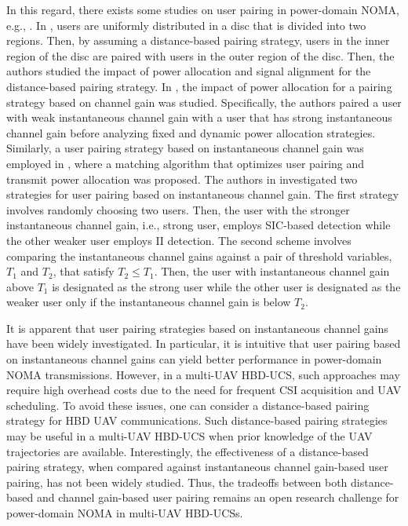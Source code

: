 In this regard, there exists some studies on user pairing in power-domain NOMA, e.g., \cite{ding2016general,ding2016impact,liang2017user,zhang2017downlink}. In \cite{ding2016general}, users are uniformly distributed in a disc that is divided into two regions. Then, by assuming a distance-based pairing strategy, users in the inner region of the disc are paired with users in the outer region of the disc. Then, the authors studied the impact of power allocation and signal alignment for the distance-based pairing strategy. In \cite{ding2016impact}, the impact of power allocation for a pairing strategy based on channel gain was studied. Specifically, the authors paired a user with weak instantaneous channel gain with a user that has strong instantaneous channel gain before analyzing fixed and dynamic power allocation strategies. Similarly, a user pairing strategy based on instantaneous channel gain was employed in \cite{liang2017user}, where a matching algorithm that optimizes user pairing and transmit power allocation was proposed. The authors in \cite{zhang2017downlink} investigated two strategies for user pairing based on instantaneous channel gain. The first strategy involves randomly choosing two users. Then, the user with the stronger instantaneous channel gain, i.e., strong user, employs SIC-based detection while the other weaker user employs II detection. The second scheme involves comparing the instantaneous channel gains against a pair of threshold variables, $T_1$ and $T_2$, that satisfy $T_2 \leq T_1$. Then, the user with instantaneous channel gain above $T_1$ is designated as the strong user while the other user is designated as the weaker user only if the instantaneous channel gain is below $T_2$.

It is apparent that user pairing strategies based on instantaneous channel gains have been widely investigated. In particular, it is intuitive that user pairing based on instantaneous channel gains can yield better performance in power-domain NOMA transmissions. However, in a multi-UAV HBD-UCS, such approaches may require high overhead costs due to the need for frequent CSI acquisition and UAV scheduling. To avoid these issues, one can consider a distance-based pairing strategy for HBD UAV communications. Such distance-based pairing strategies may be useful in a multi-UAV HBD-UCS when prior knowledge of the UAV trajectories are available. Interestingly, the effectiveness of a distance-based pairing strategy, when compared against instantaneous channel gain-based user pairing, has not been widely studied. Thus, the tradeoffs between both distance-based and channel gain-based user pairing remains an open research challenge for power-domain NOMA in multi-UAV HBD-UCSs. 

